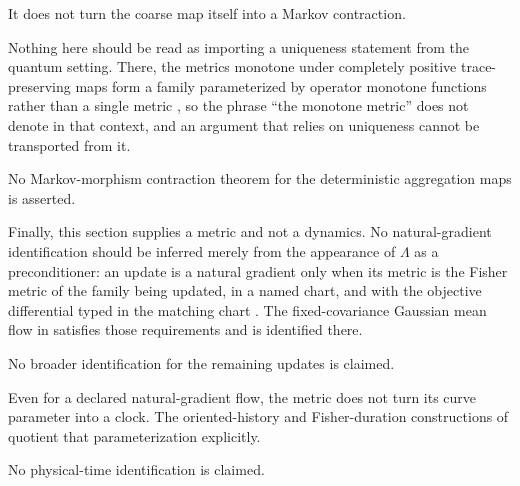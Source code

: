It does not turn the coarse map itself into a Markov contraction. 

Nothing here should be read as importing a uniqueness statement from the quantum setting. There, the metrics monotone under completely positive trace-preserving maps form a family parameterized by operator monotone functions rather than a single metric \citep{Petz1996}, so the phrase ``the monotone metric'' does not denote in that context, and an argument that relies on uniqueness cannot be transported from it. 

No Markov-morphism contraction theorem for the deterministic aggregation maps is asserted. 

Finally, this section supplies a metric and not a dynamics. No natural-gradient
identification should be inferred merely from the appearance of \(\Lambda\) as
a preconditioner: an update is a natural gradient only when its metric is the
Fisher metric of the family being updated, in a named chart, and with the
objective differential typed in the matching chart
\citep{Amari1998,martens2020new}. The fixed-covariance Gaussian mean flow in
 satisfies those requirements and is
identified there. 

No broader identification for the remaining updates is claimed. 

Even for a declared natural-gradient flow, the
metric does not turn its curve parameter into a clock. The oriented-history
and Fisher-duration constructions of  quotient
that parameterization explicitly. 

No physical-time identification is claimed. 
